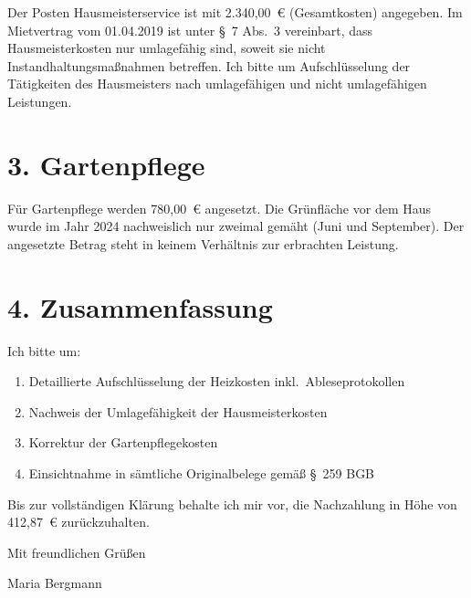 \documentclass[a4paper,11pt]{article}
\begin{document}
Der Posten \glqq Hausmeisterservice\grqq{} ist mit 2.340,00~\euro{} (Gesamtkosten) angegeben. Im Mietvertrag vom 01.04.2019 ist unter \S~7 Abs.~3 vereinbart, dass Hausmeisterkosten nur umlagef\"ahig sind, soweit sie nicht Instandhaltungsma\ss nahmen betreffen. Ich bitte um Aufschl\"usselung der T\"atigkeiten des Hausmeisters nach umlagef\"ahigen und nicht umlagef\"ahigen Leistungen.

\section*{3. Gartenpflege}

F\"ur Gartenpflege werden 780,00~\euro{} angesetzt. Die Gr\"unfl\"ache vor dem Haus wurde im Jahr 2024 nachweislich nur zweimal gem\"aht (Juni und September). Der angesetzte Betrag steht in keinem Verh\"altnis zur erbrachten Leistung.

\section*{4. Zusammenfassung}

Ich bitte um:
\begin{enumerate}
    \item Detaillierte Aufschl\"usselung der Heizkosten inkl.\ Ableseprotokollen
    \item Nachweis der Umlagef\"ahigkeit der Hausmeisterkosten
    \item Korrektur der Gartenpflegekosten
    \item Einsichtnahme in s\"amtliche Originalbelege gem\"a\ss{} \S~259 BGB
\end{enumerate}

Bis zur vollst\"andigen Kl\"arung behalte ich mir vor, die Nachzahlung in H\"ohe von 412,87~\euro{} zur\"uckzuhalten.

\vspace{1cm}

Mit freundlichen Gr\"u\ss en

\vspace{1.5cm}

Maria Bergmann
\end{document}
